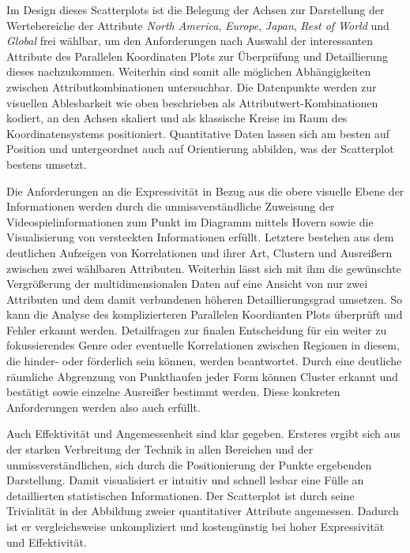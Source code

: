 \documentclass[usegeometry=true]{scrartcl}
\begin{document}
Im Design dieses Scatterplots ist die Belegung der Achsen zur Darstellung der Wertebereiche der Attribute \textit{North America}, \textit{Europe}, \textit{Japan}, \textit{Rest of World} und \textit{Global} frei wählbar, 
um den Anforderungen nach Auswahl der interessanten Attribute des Parallelen Koordinaten Plots zur Überprüfung und Detaillierung dieses nachzukommen.
Weiterhin sind somit alle möglichen Abhängigkeiten zwischen Attributkombinationen untersuchbar. 
Die Datenpunkte werden zur visuellen Ablesbarkeit wie oben beschrieben als Attributwert-Kombinationen kodiert, an den Achsen skaliert und als klassische Kreise im Raum des Koordinatensystems positioniert. 
Quantitative Daten lassen sich am besten auf Position und untergeordnet auch auf Orientierung abbilden, was der Scatterplot bestens umsetzt.%

Die Anforderungen an die Expressivität in Bezug aus die obere visuelle Ebene der Informationen werden durch die unmissverständliche Zuweisung der Videospielinformationen zum Punkt im Diagramm mittels Hovern sowie die Visualisierung von 
versteckten Informationen erfüllt. 
Letztere bestehen aus dem deutlichen Aufzeigen von Korrelationen und ihrer Art, Clustern und Ausreißern zwischen zwei wählbaren Attributen.
Weiterhin lässt sich mit ihm die gewünschte Vergrößerung der multidimensionalen Daten auf eine Ansicht von nur zwei Attributen und dem damit verbundenen höheren Detaillierungsgrad umsetzen. 
So kann die Analyse des komplizierteren Parallelen Koordianten Plots überprüft und Fehler erkannt werden. 
Detailfragen zur finalen Entscheidung für ein weiter zu fokussierendes Genre oder eventuelle Korrelationen zwischen Regionen in diesem, die hinder- oder förderlich sein können, werden beantwortet. 
Durch eine deutliche räumliche Abgrenzung von Punkthaufen jeder Form können Cluster erkannt und bestätigt sowie einzelne Ausreißer bestimmt werden.
Diese konkreten Anforderungen werden also auch erfüllt.

Auch Effektivität und Angemessenheit sind klar gegeben. 
Ersteres ergibt sich aus der starken Verbreitung der Technik in allen Bereichen und der unmissverständlichen, sich durch die Positionierung der Punkte ergebenden Darstellung. 
Damit visualisiert er intuitiv und schnell lesbar eine Fülle an detaillierten statistischen Informationen.
Der Scatterplot ist durch seine Trivialität in der Abbildung zweier quantitativer Attribute angemessen. 
Dadurch ist er vergleichsweise unkompliziert und kostengünstig bei hoher Expressivität und Effektivität.
\end{document}
